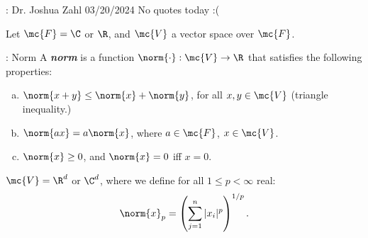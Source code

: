 \begin{nquote}{: Dr. Joshua Zahl 03/20/2024}
    No quotes today :(
\end{nquote}
Let \(\mc{F}=\C\)  or \(\R\), and \(\mc{V}\) a vector space  over \(\mc{F}\).

\begin{ndef}{: Norm}
    A \emph{\textbf{norm}} is a function \(\norm{\cdot}:\mc{V}\to\R\) that satisfies the following properties:
    \begin{enumerate}[(a)]
        \item \(\norm{x+y}\leq \norm{x}+\norm{y}\), for all \(x,y\in\mc{V}\) (triangle inequality.)
        
        \item \(\norm{ax}=a\norm{x}\), where \(a\in\mc{F}\), \(x\in\mc{V}\).
        
        \item \(\norm{x}\geq 0\), and \(\norm{x}=0\) iff \(x=0\).
    \end{enumerate}
\end{ndef}

\begin{example}
    \(\mc{V}=\R^d\) or \(\C^d\), where we define for all \(1\leq p<\infty\) real:
    \begin{equation*} 
        \norm{x}_p=\left(\sum_{j=1}^n |x_i|^p\right)^{1/p}.
    \end{equation*}
\end{example}

